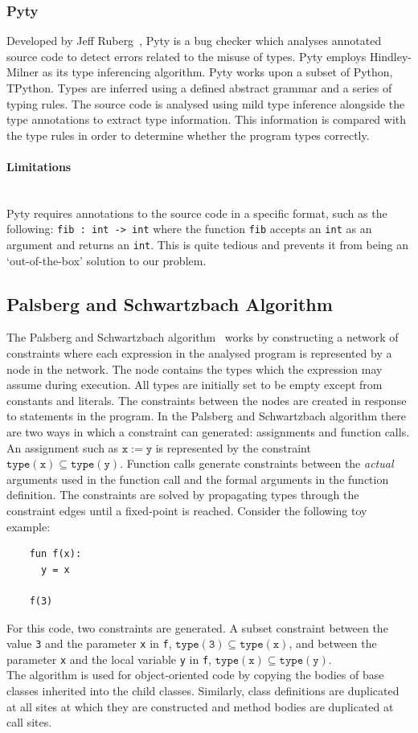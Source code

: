 \documentclass[12pt, titlepage]{article}
\begin{document}
\subsubsection{Pyty}
Developed by Jeff Ruberg~\cite{pyty}, Pyty is a bug checker which analyses annotated source code to detect errors related to the misuse of types. Pyty employs Hindley-Milner as its type inferencing algorithm. Pyty works upon a subset of Python, TPython. Types are inferred using a defined abstract grammar and a series of typing rules. The source code is analysed using mild type inference alongside the type annotations to extract type information. This information is compared with the type rules in order to determine whether the program types correctly.
\paragraph{Limitations}\mbox{}\\
Pyty requires annotations to the source code in a specific format, such as the following: \texttt{fib : int -> int} where the function \texttt{fib} accepts an \texttt{int} as an argument and returns an \texttt{int}. This is quite tedious and prevents it from being an `out-of-the-box' solution to our problem.

\subsection{Palsberg and Schwartzbach Algorithm}
The Palsberg and Schwartzbach algorithm~\cite{Palsbergstatictyping} works by constructing a network of constraints where each expression in the analysed program is represented by a node in the network. The node contains the types which the expression may assume during execution. All types are initially set to be empty except from constants and literals. The constraints between the nodes are created in response to statements in the program. In the Palsberg and Schwartzbach algorithm there are two ways in which a constraint can generated: assignments and function calls. An assignment such as $\mathtt{x := y}$ is represented by the constraint $\mathtt{type(x) \subseteq type(y)}$. Function calls generate constraints between the \textit{actual} arguments used in the function call and the formal arguments in the function definition. The constraints are solved by propagating types through the constraint edges until a fixed-point is reached. Consider the following toy example: 
\begin{lstlisting}
    fun f(x):
      y = x
      
    f(3)
\end{lstlisting}
For this code, two constraints are generated. A subset constraint between the value \texttt{3} and the parameter \texttt{x} in \texttt{f}, $\mathtt{type(3) \subseteq type(x)}$, and between the parameter \texttt{x} and the local variable \texttt{y} in \texttt{f}, $\mathtt{type(x) \subseteq type(y)}$.  \\
\indent The algorithm is used for object-oriented code by copying the bodies of base classes inherited into the child classes. Similarly, class definitions are duplicated at all sites at which they are constructed and method bodies are duplicated at call sites.
\end{document}
